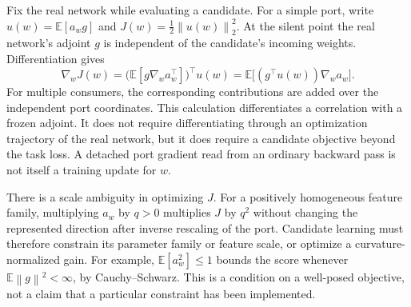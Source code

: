\documentclass[10pt]{article}
\theoremstyle{paper}
\newcommand{\E}{\mathbb E}
\newcommand{\norm}[1]{\left\lVert #1\right\rVert}
\begin{document}
Fix the real network while evaluating a candidate. For a simple port, write $u(w)=\E[a_wg]$ and $J(w)=\tfrac12\norm{u(w)}_2^2$. At the silent point the real network's adjoint $g$ is independent of the candidate's incoming weights. Differentiation gives
\begin{equation}
\nabla_wJ(w)=\bigl(\E[g\nabla_wa_w^\top]\bigr)^\top u(w)
=\E\bigl[(g^\top u(w))\nabla_wa_w\bigr].
\label{eq:candidategrad}
\end{equation}
For multiple consumers, the corresponding contributions are added over the independent port coordinates. This calculation differentiates a correlation with a frozen adjoint. It does not require differentiating through an optimization trajectory of the real network, but it does require a candidate objective beyond the task loss. A detached port gradient read from an ordinary backward pass is not itself a training update for $w$.

There is a scale ambiguity in optimizing $J$. For a positively homogeneous feature family, multiplying $a_w$ by $q>0$ multiplies $J$ by $q^2$ without changing the represented direction after inverse rescaling of the port. Candidate learning must therefore constrain its parameter family or feature scale, or optimize a curvature-normalized gain. For example, $\E[a_w^2]\le1$ bounds the score whenever $\E\norm g^2<\infty$, by Cauchy--Schwarz. This is a condition on a well-posed objective, not a claim that a particular constraint has been implemented.
\end{document}
